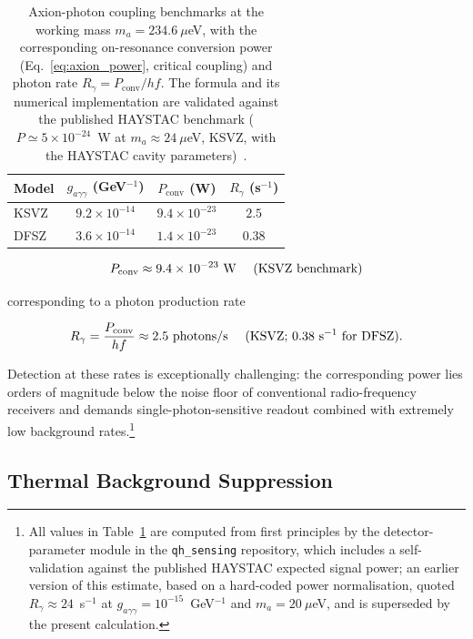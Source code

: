 \begin{table}[htbp]
\centering
\caption{Axion-photon coupling benchmarks at the working mass
$m_a = 234.6~\mu$eV, with the corresponding on-resonance conversion power
(Eq.~\eqref{eq:axion_power}, critical coupling) and photon rate
$R_\gamma = P_{\mathrm{conv}}/hf$. The formula and its numerical
implementation are validated against the published HAYSTAC benchmark
($P \simeq 5\times10^{-24}$~W at $m_a \approx 24~\mu$eV, KSVZ, with the
HAYSTAC cavity parameters)~\cite{Zhong2018, Backes2021}.}
\label{tab:axion_benchmarks}
\begin{tabular}{lccc}
\hline\hline
Model & $g_{a\gamma\gamma}$ (GeV$^{-1}$) & $P_{\mathrm{conv}}$ (W) & $R_\gamma$ (s$^{-1}$) \\
\hline
KSVZ & $9.2\times10^{-14}$ & $9.4\times10^{-23}$ & $2.5$ \\
DFSZ & $3.6\times10^{-14}$ & $1.4\times10^{-23}$ & $0.38$ \\
\hline\hline
\end{tabular}
\end{table}

\begin{equation}
    P_{\mathrm{conv}} \approx 9.4\times10^{-23} \text{ W \quad (KSVZ benchmark)}
    \label{eq:axion_power_typical}
\end{equation}

corresponding to a photon production rate

\begin{equation}
    R_\gamma = \frac{P_{\mathrm{conv}}}{h f} \approx 2.5 \text{ photons/s
    \quad (KSVZ; } 0.38 \text{ s}^{-1} \text{ for DFSZ)}.
    \label{eq:photon_rate}
\end{equation}

Detection at these rates is exceptionally challenging: the corresponding
power lies orders of magnitude below the noise floor of conventional
radio-frequency receivers and demands single-photon-sensitive readout
combined with extremely low background rates.\footnote{All values in
Table~\ref{tab:axion_benchmarks} are computed from first principles by the
detector-parameter module in the \texttt{qh\_sensing} repository, which
includes a self-validation against the published HAYSTAC expected signal
power; an earlier version of this estimate, based on a hard-coded power
normalisation, quoted $R_\gamma \approx 24$~s$^{-1}$ at
$g_{a\gamma\gamma} = 10^{-15}$~GeV$^{-1}$ and $m_a = 20~\mu$eV, and is
superseded by the present calculation.}

\subsection*{Thermal Background Suppression}

